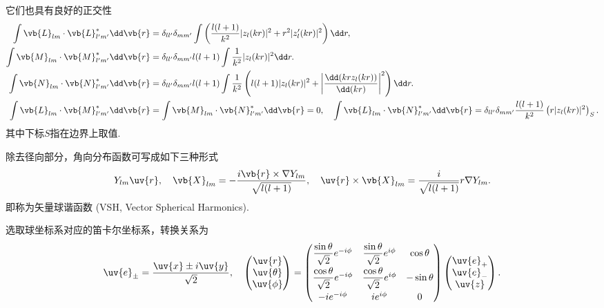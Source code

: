它们也具有良好的正交性
\begin{align*}
	\int \vb{L}_{lm} \cdot \vb{L}_{l'm'}^* \dd \vb{r} &= \delta_{ll'} \delta_{mm'} \int \left( \frac{l(l+1)}{k^2} |z_l(kr)|^2 + r^2 |z_l'(kr)|^2 \right) \dd r, \\
	\int \vb{M}_{lm} \cdot \vb{M}_{l'm'}^* \dd \vb{r} &= \delta_{ll'} \delta_{mm'} l(l+1) \int \frac{1}{k^2} |z_l(kr)|^2 \dd r. \\
	\int \vb{N}_{lm} \cdot \vb{N}_{l'm'}^* \dd \vb{r} &= \delta_{ll'} \delta_{mm'} l(l+1) \int \frac{1}{k^2} \left( l(l+1) |z_l(kr)|^2 + \left| \frac{\dd(kr z_l(kr))}{\dd(kr)} \right|^2 \right) \dd r. \\
	\int \vb{L}_{lm} \cdot \vb{M}_{l'm'}^* \dd \vb{r} &= \int \vb{M}_{lm} \cdot \vb{N}_{l'm'}^* \dd \vb{r} = 0, \quad
	\int \vb{L}_{lm} \cdot \vb{N}_{l'm'}^* \dd \vb{r} = \delta_{ll'} \delta_{mm'} \frac{l(l+1)}{k^2}  \left( r |z_l(kr)|^2 \right)_S.
\end{align*}
其中下标\(S\)指在边界上取值.

除去径向部分，角向分布函数可写成如下三种形式
\begin{align*}
	Y_{lm} \uv{r}, \quad
	\vb{X}_{lm} = -\frac{i \vb{r} \times \nabla Y_{lm}}{\sqrt{l(l+1)}}, \quad
	\uv{r} \times \vb{X}_{lm} = \frac{i}{\sqrt{l(l+1)}} r \nabla Y_{lm}.
\end{align*}
即称为矢量球谐函数 (VSH, Vector Spherical Harmonics).

选取球坐标系对应的笛卡尔坐标系，转换关系为
\begin{align*}
	\uv{e}_{\pm} = \frac{\uv{x} \pm i \uv{y}}{\sqrt{2}}, \quad
	\begin{pmatrix} \uv{r} \\ \uv{\theta} \\ \uv{\phi} \end{pmatrix} = \begin{pmatrix}
		\dfrac{\sin\theta}{\sqrt{2}} e^{-i\phi} & \dfrac{\sin\theta}{\sqrt{2}} e^{i\phi} & \cos\theta  \\[8pt]
		\dfrac{\cos\theta}{\sqrt{2}} e^{-i\phi} & \dfrac{\cos\theta}{\sqrt{2}} e^{i\phi} & -\sin\theta \\[8pt]
		-i e^{-i\phi}                           & i e^{i\phi}                            & 0
	\end{pmatrix} \begin{pmatrix} \uv{e}_+ \\ \uv{e}_- \\ \uv{z} \end{pmatrix}.
\end{align*}

